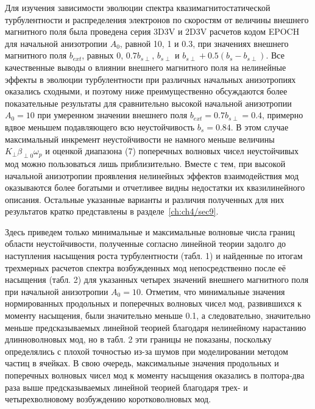 Для изучения зависимости эволюции спектра квазимагнитостатической турбулентности и распределения электронов по скоростям от величины внешнего магнитного поля была проведена серия 3D3V и 2D3V расчетов кодом EPOCH для начальной анизотропии $A_0$, равной 10, 1 и 0.3, при значениях внешнего магнитного поля $b_{ext}$, равных 0, $0.7b_{s\perp}$, $b_{s\perp}$ и $b_{s\perp}+0.5(b_s-b_{s\perp})$. Все качественные выводы о влиянии внешнего магнитного поля на нелинейные эффекты в эволюции турбулентности при различных начальных анизотропиях оказались сходными, и поэтому ниже преимущественно обсуждаются более показательные результаты для сравнительно высокой начальной анизотропии $A_0=10$ при умеренном значении внешнего поля $b_{ext}=0.7b_{s\perp}=0.4$, примерно вдвое меньшем подавляющего всю неустойчивость $b_{s}=0.84$. В этом случае максимальный инкремент неустойчивости не намного меньше величины $K_\perp\beta_{\perp0 }\omega_p$ и оценкой диапазона (7) поперечных волновых чисел неустойчивых мод можно пользоваться лишь приблизительно. Вместе с тем, при высокой начальной анизотропии проявления нелинейных эффектов взаимодействия мод оказываются более богатыми и отчетливее видны недостатки их квазилинейного описания. Остальные указанные варианты и различия полученных для них результатов кратко представлены в разделе~\ref{ch:ch4/sec9}.

Здесь приведем только минимальные и максимальные волновые числа границ области неустойчивости, полученные согласно линейной теории задолго до наступления насыщения роста турбулентности (табл. 1) и найденные по итогам трехмерных расчетов спектра возбужденных мод непосредственно после её насыщения (табл. 2) для указанных четырех значений внешнего магнитного поля при начальной анизотропии $A_0=10$. Отметим, что минимальные значения нормированных продольных и поперечных волновых чисел мод, развившихся к моменту насыщения, были значительно меньше 0.1, а следовательно, значительно меньше предсказываемых линейной теорией благодаря нелинейному нарастанию длинноволновых мод, но в табл. 2 эти границы не показаны, поскольку определялись с плохой точностью из-за шумов при моделировании методом частиц в ячейках. В свою очередь, максимальные значения продольных и поперечных волновых чисел мод к моменту насыщения оказались в полтора-два раза выше предсказываемых линейной теорией благодаря трех- и четырехволновому возбуждению коротковолновых мод.

